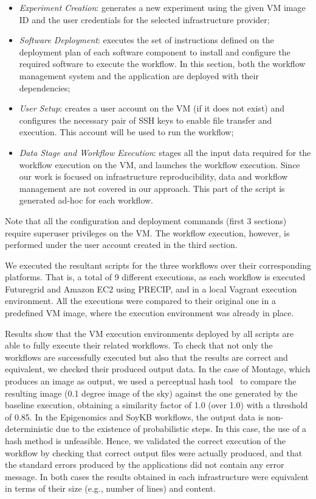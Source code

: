 \begin{itemize}
	\item \emph{Experiment Creation}: generates a new experiment using the 
		given VM image ID and the user credentials for the selected infrastructure 
		provider;
    	    
	\item \emph{Software Deployment}: executes the set of instructions defined on 
		the deployment plan of each software component to install and configure 
		the required software to execute the workflow. In this section, both the 
		workflow management system and the application are deployed with their 
		dependencies;

	\item \emph{User Setup}: creates a user account on the VM (if it does not exist) 
		and configures the necessary pair of SSH keys to enable file transfer and 
		execution. This account will be used to run the workflow;
	   
	\item \emph{Data Stage and Workflow Execution}: stages all the input data required 
		for the workflow execution on the VM, and launches the workflow execution. 
		Since our work is focused on infrastructure reproducibility, data and workflow 
		management are not covered in our approach. This part of the script is 
		generated ad-hoc for each workflow.
\end{itemize}

\noindent Note that all the configuration and deployment commands (first 3 sections) 
require superuser privileges on the VM. The workflow execution, however, is performed 
under the user account created in the third section.

We executed the resultant scripts for the three workflows over their corresponding 
platforms. That is, a total of 9 different executions, as each workflow is executed  
Futuregrid and Amazon EC2 using PRECIP, and in a local Vagrant execution 
environment. All the executions were compared to their original one in a predefined 
VM image, where the execution environment was already in place.

Results show that the VM execution environments deployed by all scripts are able to
fully execute their related workflows. To check that not only the workflows are successfully executed but also 
that the results are correct and equivalent, we checked their produced output data. In the 
case of Montage, which produces an image as output, we used a perceptual hash tool~\cite{phash}
to compare the resulting image (0.1 degree image of the sky) against the one generated 
by the baseline execution, obtaining a similarity factor of 1.0 (over 1.0) with a threshold of 
0.85. In the Epigenomics and SoyKB workflows, the output data is non-deterministic due to
the existence of probabilistic steps. In this case, the use of a hash method is unfeasible. 
Hence, we validated the correct execution of the workflow by checking that correct output 
files were actually produced, and that the standard errors produced by the applications did not contain any error message.
In both cases the results obtained in each infrastructure were equivalent in terms of their size (e.g., number of lines) 
and content.

